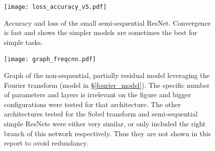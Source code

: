 \documentclass{article}
\begin{document}
\begin{figure}[h]
    \centering
    \texttt{[image: loss\_accuracy\_v5.pdf]}
    \caption{Accuracy and loss of the small semi-sequential ResNet. Convergence is fast and shows the simpler models are sometimes the best for simple tasks.}
    \label{fig:loss_acc_conv}
\end{figure}

\begin{figure}[h]
    \centering
    \texttt{[image: graph\_freqcnn.pdf]}
    \caption{Graph of the non-sequential, partially residual model leveraging the Fourier transform (model in \S \ref{fourier_model}). The specific number of parameters and layers is  irrelevant on the figure and bigger configurations were tested for that architecture. The other architectures tested for the Sobel transform and semi-sequential simple ResNets were either very similar, or only included the right branch of this network respectively. Thus they are not shown in this report to avoid redundancy.}
    \label{fig:freqcnn}
\end{figure}

\newpage
\nocite{*}
 
\end{document}

